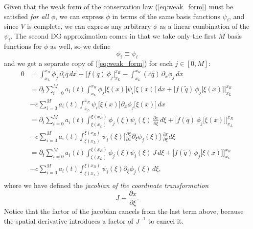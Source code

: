 \documentclass[12pt]{article}
\numberwithin{equation}{section}
\begin{document}
Given that the weak form of the conservation law (\ref{eq:weak_form}) must be satisfied \textit{for all $\phi$}, we can express $\phi$ in terms of the same basis functions $\psi_i$, and since $V$ is complete, we can express any arbitrary $\phi$ as a linear combination of the $\psi_i$.  The second DG approximation comes in that we take only the first $M$ basis functions for $\phi$ as well, so we define
\begin{equation}
\phi_i \equiv \psi_i
\end{equation}
and we get a separate copy of (\ref{eq:weak_form}) for each $j \in [0, M]$:
\begin{equation} \label{eq:weak_form_approx}
\begin{aligned}
0 &= \int_{x_L}^{x_R} \phi_j \, \partial_t \tilde{q} \, dx + \big[ f(\tilde{q}) \, \phi_j \big]^{x_R}_{x_L} - \int_{x_L}^{x_R} (c \tilde{q}) \, \partial_x \phi_j \, dx \\
&= \partial_t \sum_{i=0}^{M} a_i(t) \int_{x_L}^{x_R} \phi_j\big[ \xi(x) \big] \psi_i\big[ \xi(x) \big] \, dx + \Big[ f(\tilde{q}) \, \phi_j\big[ \xi(x) \big] \Big]^{x_R}_{x_L} \\
&- c \sum_{i=0}^{M} a_i(t) \int_{x_L}^{x_R} \psi_i\big[ \xi(x) \big] \partial_x \phi_j\big[ \xi(x) \big] \, dx \\
&= \partial_t \sum_{i=0}^{M} a_i(t) \int_{\xi(x_L)}^{\xi(x_R)} \phi_j(\xi) \psi_i(\xi) \, \frac{\partial x}{\partial \xi} \, d\xi + \Big[ f(\tilde{q}) \, \phi_j\big[ \xi(x) \big] \Big]^{x_R}_{x_L} \\
&- c \sum_{i=0}^{M} a_i(t) \int_{\xi(x_L)}^{\xi(x_R)} \psi_i(\xi) \Big[ \frac{\partial \xi}{\partial x} \partial_\xi \phi_j(\xi) \Big] \, \frac{\partial x}{\partial \xi} d \xi \\
&= \partial_t \sum_{i=0}^{M} a_i(t) \int_{\xi(x_L)}^{\xi(x_R)} \phi_j(\xi) \psi_i(\xi) \, J \, d\xi + \Big[ f(\tilde{q}) \, \phi_j\big[ \xi(x) \big] \Big]^{x_R}_{x_L} \\
&- c \sum_{i=0}^{M} a_i(t) \int_{\xi(x_L)}^{\xi(x_R)} \psi_i(\xi) \partial_\xi \phi_j(\xi) \, d \xi, \\
\end{aligned}
\end{equation}
where we have defined the \textit{jacobian of the coordinate transformation}
\begin{equation}
J \equiv \frac{\partial x}{\partial \xi}.
\end{equation}
Notice that the factor of the jacobian cancels from the last term above, because the spatial derivative introduces a factor of $J^{-1}$ to cancel it.
\end{document}
